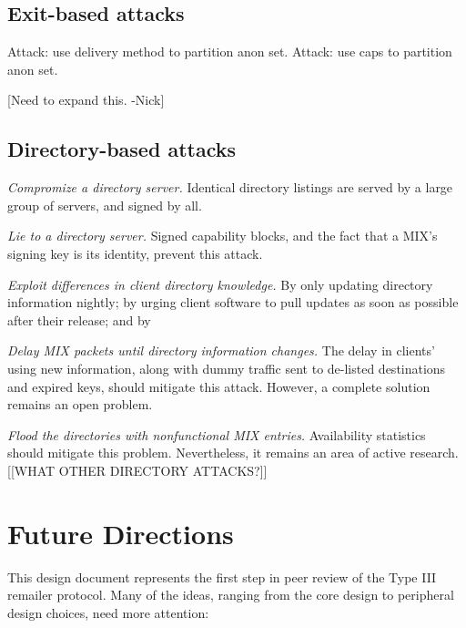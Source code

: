 \documentclass{llncs}
\begin{document}
\subsection{Exit-based attacks}
\label{subsec:attacks-exitbased}

Attack: use delivery method to partition anon set.
Attack: use caps to partition anon set.

[Need to expand this. -Nick]

\subsection{Directory-based attacks}
\label{subsec:attacks-dirbased}

\begin{description}
\item \emph{Compromize a directory server.} Identical directory listings
  are served by a large group of servers, and signed by all.
\item \emph{Lie to a directory server.}  Signed capability blocks, and
  the fact that a MIX's signing key is its identity, prevent this
  attack.
\item \emph{Exploit differences in client directory knowledge.}  By
  only updating directory information nightly; by urging client
  software to pull updates as soon as possible after their release;
  and by 
\item \emph{Delay MIX packets until directory information changes.}
  The delay in clients' using new information, along with dummy
  traffic sent to de-listed destinations and expired keys, should
  mitigate this attack. However, a complete solution remains an
  open problem.
\item \emph{Flood the directories with nonfunctional MIX entries.}
  Availability statistics should mitigate this problem.  Nevertheless,
  it remains an area of active research. \cite{mix-acc,casc-rep}
[[WHAT OTHER DIRECTORY ATTACKS?]]
\end{description}


\section{Future Directions}
\label{sec:conclusion}

This design document represents the first step in peer review of the
Type III remailer protocol. Many of the ideas, ranging from the core
design to peripheral design choices, need more attention:
\end{document}

